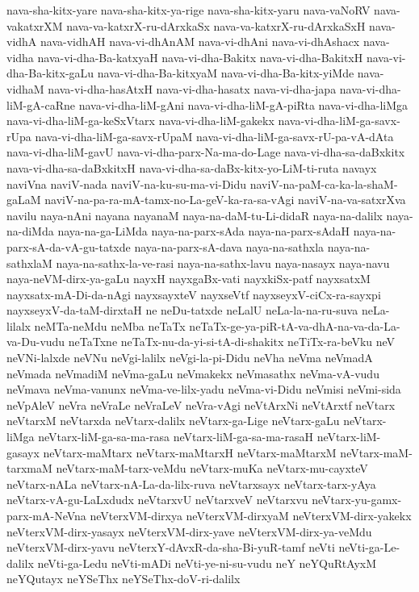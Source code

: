 {nava-sha-kitx-yare
nava-sha-kitx-ya-rige
nava-sha-kitx-yaru
nava-vaNoRV
nava-vakatxrXM
nava-va-katxrX-ru-dArxkaSx
nava-va-katxrX-ru-dArxkaSxH
nava-vidhA
nava-vidhAH
nava-vi-dhAnAM
nava-vi-dhAni
nava-vi-dhAshacx
nava-vidha
nava-vi-dha-Ba-katxyaH
nava-vi-dha-Bakitx
nava-vi-dha-BakitxH
nava-vi-dha-Ba-kitx-gaLu
nava-vi-dha-Ba-kitxyaM
nava-vi-dha-Ba-kitx-yiMde
nava-vidhaM
nava-vi-dha-hasAtxH
nava-vi-dha-hasatx
nava-vi-dha-japa
nava-vi-dha-liM-gA-caRne
nava-vi-dha-liM-gAni
nava-vi-dha-liM-gA-piRta
nava-vi-dha-liMga
nava-vi-dha-liM-ga-keSxVtarx
nava-vi-dha-liM-gakekx
nava-vi-dha-liM-ga-savx-rUpa
nava-vi-dha-liM-ga-savx-rUpaM
nava-vi-dha-liM-ga-savx-rU-pa-vA-dAta
nava-vi-dha-liM-gavU
nava-vi-dha-parx-Na-ma-do-Lage
nava-vi-dha-sa-daBxkitx
nava-vi-dha-sa-daBxkitxH
nava-vi-dha-sa-daBx-kitx-yo-LiM-ti-ruta
navayx
naviVna
naviV-nada
naviV-na-ku-su-ma-vi-Didu
naviV-na-paM-ca-ka-la-shaM-gaLaM
naviV-na-pa-ra-mA-tamx-no-La-geV-ka-ra-sa-vAgi
naviV-na-va-satxrXva
navilu
naya-nAni
nayana
nayanaM
naya-na-daM-tu-Li-didaR
naya-na-dalilx
naya-na-diMda
naya-na-ga-LiMda
naya-na-parx-sAda
naya-na-parx-sAdaH
naya-na-parx-sA-da-vA-gu-tatxde
naya-na-parx-sA-dava
naya-na-sathxla
naya-na-sathxlaM
naya-na-sathx-la-ve-rasi
naya-na-sathx-lavu
naya-nasayx
naya-navu
naya-neVM-dirx-ya-gaLu
nayxH
nayxgaBx-vati
nayxkiSx-patf
nayxsatxM
nayxsatx-mA-Di-da-nAgi
nayxsayxteV
nayxseVtf
nayxseyxV-ciCx-ra-sayxpi
nayxseyxV-da-taM-dirxtaH
ne
neDu-tatxde
neLalU
neLa-la-na-ru-suva
neLa-lilalx
neMTa-neMdu
neMba
neTaTx
neTaTx-ge-ya-piR-tA-va-dhA-na-va-da-La-va-Du-vudu
neTaTxne
neTaTx-nu-da-yi-si-tA-di-shakitx
neTiTx-ra-beVku
neV
neVNi-lalxde
neVNu
neVgi-lalilx
neVgi-la-pi-Didu
neVha
neVma
neVmadA
neVmada
neVmadiM
neVma-gaLu
neVmakekx
neVmasathx
neVma-vA-vudu
neVmava
neVma-vanunx
neVma-ve-lilx-yadu
neVma-vi-Didu
neVmisi
neVmi-sida
neVpAleV
neVra
neVraLe
neVraLeV
neVra-vAgi
neVtArxNi
neVtArxtf
neVtarx
neVtarxM
neVtarxda
neVtarx-dalilx
neVtarx-ga-Lige
neVtarx-gaLu
neVtarx-liMga
neVtarx-liM-ga-sa-ma-rasa
neVtarx-liM-ga-sa-ma-rasaH
neVtarx-liM-gasayx
neVtarx-maMtarx
neVtarx-maMtarxH
neVtarx-maMtarxM
neVtarx-maM-tarxmaM
neVtarx-maM-tarx-veMdu
neVtarx-muKa
neVtarx-mu-cayxteV
neVtarx-nALa
neVtarx-nA-La-da-lilx-ruva
neVtarxsayx
neVtarx-tarx-yAya
neVtarx-vA-gu-LaLxdudx
neVtarxvU
neVtarxveV
neVtarxvu
neVtarx-yu-gamx-parx-mA-NeVna
neVterxVM-dirxya
neVterxVM-dirxyaM
neVterxVM-dirx-yakekx
neVterxVM-dirx-yasayx
neVterxVM-dirx-yave
neVterxVM-dirx-ya-veMdu
neVterxVM-dirx-yavu
neVterxY-dAvxR-da-sha-Bi-yuR-tamf
neVti
neVti-ga-Le-dalilx
neVti-ga-Ledu
neVti-mADi
neVti-ye-ni-su-vudu
neY
neYQuRtAyxM
neYQutayx
neYSeThx
neYSeThx-doV-ri-dalilx
}
